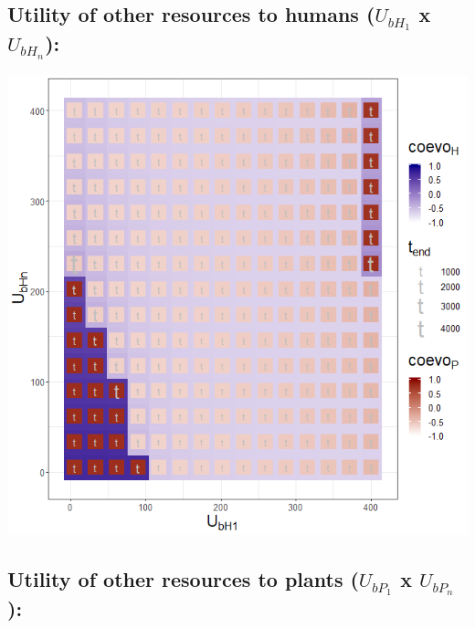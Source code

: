 \documentclass[]{book}
\begin{document}
\newpage

\hypertarget{utility-of-other-resources-to-humans-u_bh_1-x-u_bh_n}{%
\subsection{\texorpdfstring{Utility of other resources to humans (\(U_{bH_{1}}\) x \(U_{bH_{n}}\)):}{Utility of other resources to humans (U\_\{bH\_\{1\}\} x U\_\{bH\_\{n\}\}):}}\label{utility-of-other-resources-to-humans-u_bh_1-x-u_bh_n}}

\includegraphics[width=1\linewidth]{plots/3_twoPar-U.bH1-U.bHn_plot}

\newpage

\hypertarget{utility-of-other-resources-to-plants-u_bp_1-x-u_bp_n}{%
\subsection{\texorpdfstring{Utility of other resources to plants (\(U_{bP_{1}}\) x \(U_{bP_{n}}\)):}{Utility of other resources to plants (U\_\{bP\_\{1\}\} x U\_\{bP\_\{n\}\}):}}\label{utility-of-other-resources-to-plants-u_bp_1-x-u_bp_n}}
\end{document}
